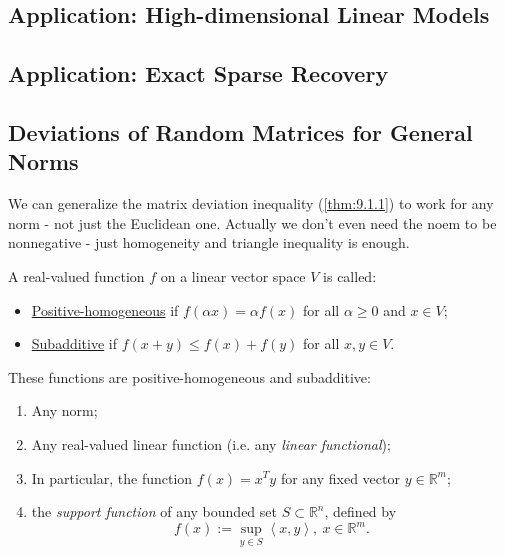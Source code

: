 \subsection{Application: High-dimensional Linear Models}



\subsection{Application: Exact Sparse Recovery}



\subsection{Deviations of Random Matrices for General Norms}
We can generalize the matrix deviation inequality (\cref{thm:9.1.1}) to work for any norm - not just the 
Euclidean one. Actually we don't even need the noem to be nonnegative - just homogeneity and triangle inequality 
is enough.

\begin{definition}[]
\label{def:9.6.1}
A real-valued function $f$ on a linear vector space $V$ is called:
\begin{itemize}
	\item \underline{Positive-homogeneous} if $f(\alpha x) = \alpha f(x)$ for all $\alpha \geq 0$ and $x \in V$;
	\item \underline{Subadditive} if $f(x + y) \leq f(x) + f(y)$ for all $x, y \in V$.
\end{itemize}
\end{definition}

\begin{example}[]
\label{ex:9.6.2}
These functions are positive-homogeneous and subadditive:
\begin{enumerate}
	\item Any norm;
	\item Any real-valued linear function (i.e. any \textit{linear functional});
	\item In particular, the function $f(x) = x^T y$ for any fixed vector $y \in \mathbb{R}^m$;
	\item the \textit{support function} of any bounded set $S \subset \mathbb{R}^n$, defined by 
	\[ f(x) := \sup_{y \in S}\left\langle x, y \right\rangle, \ x \in \mathbb{R}^m. \]
\end{enumerate}
\end{example}

